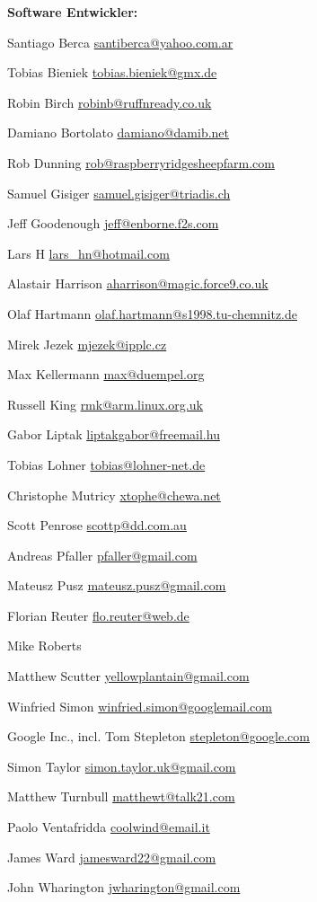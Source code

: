 {\large\bf Software Entwickler:}
\begin{compactitem}
\item Santiago Berca \url{santiberca@yahoo.com.ar}
\item Tobias Bieniek \url{tobias.bieniek@gmx.de}
\item Robin Birch \url{robinb@ruffnready.co.uk}
\item Damiano Bortolato \url{damiano@damib.net}
\item Rob Dunning \url{rob@raspberryridgesheepfarm.com}
\item Samuel Gisiger \url{samuel.gisiger@triadis.ch}
\item Jeff Goodenough \url{jeff@enborne.f2s.com}
\item Lars H \url{lars_hn@hotmail.com}
\item Alastair Harrison \url{aharrison@magic.force9.co.uk}
\item Olaf Hartmann \url{olaf.hartmann@s1998.tu-chemnitz.de}
\item Mirek Jezek \url{mjezek@ipplc.cz}
\item Max Kellermann \url{max@duempel.org}
\item Russell King \url{rmk@arm.linux.org.uk}
\item Gabor Liptak \url{liptakgabor@freemail.hu}
\item Tobias Lohner \url{tobias@lohner-net.de}
\item Christophe Mutricy \url{xtophe@chewa.net}
\item Scott Penrose \url{scottp@dd.com.au}
\item Andreas Pfaller \url{pfaller@gmail.com}
\item Mateusz Pusz \url{mateusz.pusz@gmail.com}
\item Florian Reuter \url{flo.reuter@web.de}
\item Mike Roberts
\item Matthew Scutter \url{yellowplantain@gmail.com}
\item Winfried Simon \url{winfried.simon@googlemail.com}
\item Google Inc., incl. Tom Stepleton \url{stepleton@google.com}
\item Simon Taylor \url{simon.taylor.uk@gmail.com}
\item Matthew Turnbull \url{matthewt@talk21.com}
\item Paolo Ventafridda \url{coolwind@email.it}
\item James Ward \url{jamesward22@gmail.com}
\item John Wharington \url{jwharington@gmail.com}
\end{compactitem}

